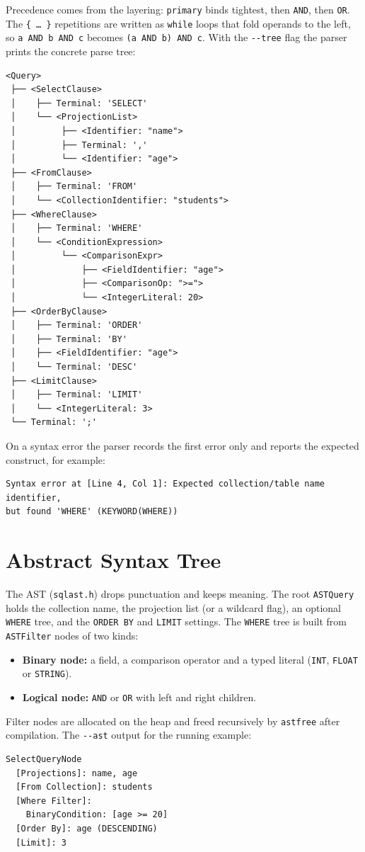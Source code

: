 \documentclass[12pt,a4paper]{report}
\newcommand{\codeus}{\textunderscore\allowbreak}
\DeclareRobustCommand{\code}[1]{\texttt{\let\_\codeus #1}}
\begin{document}
Precedence comes from the layering: \code{primary} binds tightest, then \code{AND}, then \code{OR}. The \code{\{ \ldots\ \}} repetitions are written as \code{while} loops that fold operands to the left, so \code{a AND b AND c} becomes \code{(a AND b) AND c}. With the \code{-{}-tree} flag the parser prints the concrete parse tree:
\begin{Verbatim}
<Query>
 ├── <SelectClause>
 │    ├── Terminal: 'SELECT'
 │    └── <ProjectionList>
 │         ├── <Identifier: "name">
 │         ├── Terminal: ','
 │         └── <Identifier: "age">
 ├── <FromClause>
 │    ├── Terminal: 'FROM'
 │    └── <CollectionIdentifier: "students">
 ├── <WhereClause>
 │    ├── Terminal: 'WHERE'
 │    └── <ConditionExpression>
 │         └── <ComparisonExpr>
 │             ├── <FieldIdentifier: "age">
 │             ├── <ComparisonOp: ">=">
 │             └── <IntegerLiteral: 20>
 ├── <OrderByClause>
 │    ├── Terminal: 'ORDER'
 │    ├── Terminal: 'BY'
 │    ├── <FieldIdentifier: "age">
 │    └── Terminal: 'DESC'
 ├── <LimitClause>
 │    ├── Terminal: 'LIMIT'
 │    └── <IntegerLiteral: 3>
 └── Terminal: ';'
\end{Verbatim}

On a syntax error the parser records the first error only and reports the expected construct, for example:
\begin{Verbatim}[fontsize=\footnotesize]
Syntax error at [Line 4, Col 1]: Expected collection/table name identifier,
but found 'WHERE' (KEYWORD(WHERE))
\end{Verbatim}

\section{Abstract Syntax Tree}
The AST (\code{sql\_ast.h}) drops punctuation and keeps meaning. The root \code{ASTQuery} holds the collection name, the projection list (or a wildcard flag), an optional \code{WHERE} tree, and the \code{ORDER BY} and \code{LIMIT} settings. The \code{WHERE} tree is built from \code{ASTFilter} nodes of two kinds:
\begin{itemize}
  \item \textbf{Binary node:} a field, a comparison operator and a typed literal (\code{INT}, \code{FLOAT} or \code{STRING}).
  \item \textbf{Logical node:} \code{AND} or \code{OR} with left and right children.
\end{itemize}
Filter nodes are allocated on the heap and freed recursively by \code{ast\_free} after compilation. The \code{-{}-ast} output for the running example:
\begin{Verbatim}
SelectQueryNode
  [Projections]: name, age
  [From Collection]: students
  [Where Filter]:
    BinaryCondition: [age >= 20]
  [Order By]: age (DESCENDING)
  [Limit]: 3
\end{Verbatim}
\end{document}
